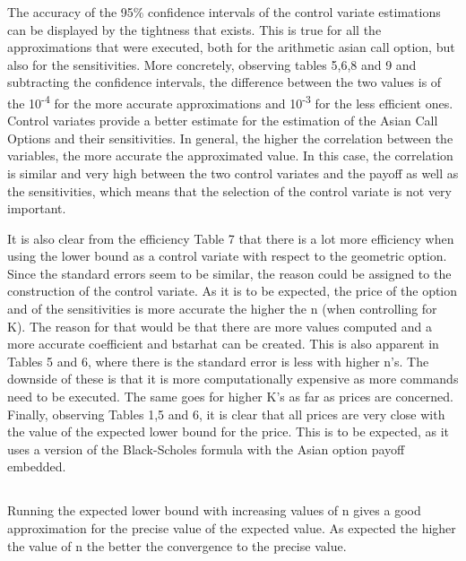 \documentclass[10pt,oneside,a4paper]{article}
\begin{document}
\begin{flushleft}
\subsubsection{}
The accuracy of the 95\% confidence intervals of the control variate estimations can be displayed by the tightness that exists. This is true for all the approximations that were executed, both for the arithmetic asian call option, but also for the sensitivities. More concretely, observing tables 5,6,8 and 9 and subtracting the confidence intervals, the difference between the two values is of the 10\textsuperscript{-4} for the more accurate approximations and 10\textsuperscript{-3} for the less efficient ones. 
\newline
Control variates provide a better estimate for the estimation of the Asian Call Options and their sensitivities. In general, the higher the correlation between the variables, the more accurate the approximated value. In this case, the correlation is similar and very high between the two control variates and the payoff as well as the sensitivities, which means that the selection of the control variate is not very important.

It is also clear from the efficiency Table 7 that there is a lot more efficiency when using the lower bound as a control variate with respect to the geometric option.  Since the standard errors seem to be similar, the reason could be assigned to the construction of the control variate. 
\newline
As it is to be expected, the price of the option and of the sensitivities is more accurate the higher the n (when controlling for K). The reason for that would be that there are more values computed and a more accurate coefficient and bstarhat can be created. This is also apparent in Tables 5 and 6, where there is the standard error is less with higher n's. The downside of these is that it is more computationally expensive as more commands need to be executed. The same goes for higher K's as far as prices are concerned. 
\newline
Finally, observing Tables 1,5 and 6, it is clear that all prices are very close with the value of the expected lower bound for the price. This is to be expected, as it uses a version of the Black-Scholes formula with the Asian option payoff embedded.

\subsection{}
Running the expected lower bound with increasing values of n gives a good approximation for the precise value of the expected value. As expected the higher the value of n the better the convergence to the precise value. 



\end{flushleft}
\end{document}
